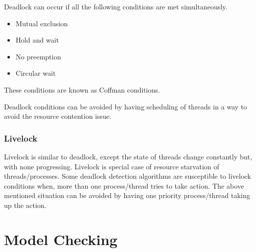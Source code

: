 Deadlock can occur if all the following conditions are met simultaneously.

\begin{itemize}
\item	Mutual exclusion
\item	Hold and wait
\item	No preemption
\item	Circular wait
\end{itemize}

These conditions are known as Coffman conditions\cite{coffman_cond}.

Deadlock conditions can be avoided by having scheduling of threads in a way to avoid the resource contention issue.

\subsubsection{Livelock}

Livelock is similar to deadlock, except the state of threads change constantly but, with none progressing. 
Livelock is special case of resource starvation of threads/processes. 
Some deadlock detection algorithms are susceptible to livelock conditions when, more than one process/thread tries to take action\cite{lopez2017study}\cite{chaki2005concurrent}. 
The above mentioned situation can be avoided by having one priority process/thread taking up the action. 

\section{Model Checking \label{model_check}}

